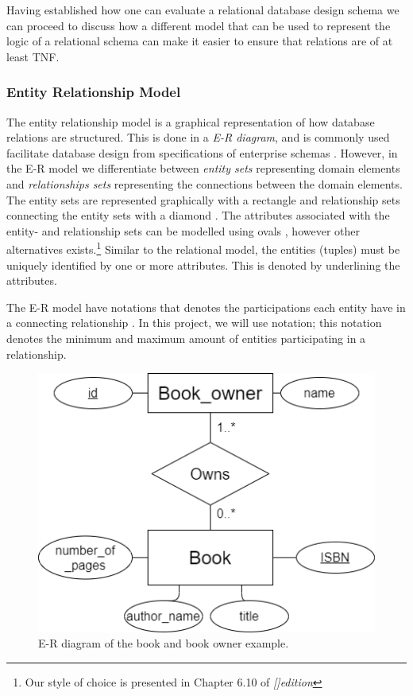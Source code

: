 Having established how one can evaluate a relational database design schema we can proceed to discuss how a different model that can be used to represent the logic of a relational schema can make it easier to ensure that relations are of at least TNF.

\subsubsection{Entity Relationship Model}\label{sec:EntityRelationModel}
The entity relationship model is a graphical representation of how database relations are structured.
This is done in a \textit{E-R diagram}, and is commonly used facilitate database design from specifications of enterprise schemas \cite{DBSBook}.
However, in the E-R model we differentiate between \textit{entity sets} representing domain elements and \textit{relationships sets} representing the connections between the domain elements. 
The entity sets are represented graphically with a rectangle and relationship sets connecting the entity sets with a diamond \cite{DBSBook}.
The attributes associated with the entity- and relationship sets can be modelled using ovals \cite{KatjaFirstPP}, however other alternatives exists.\footnote{Our style of choice is presented in Chapter 6.10 of  \textit{[]{edition}}}
Similar to the relational model, the entities (tuples) must be uniquely identified by one or more attributes. This is denoted by underlining the attributes. 

The E-R model have notations that denotes the participations each entity have in a connecting relationship \cite{DBSBook}.
In this project, we will use  notation; this notation denotes the minimum and maximum amount of entities participating in a relationship. 

\begin{figure}[htp]
    \centering
    \includegraphics[scale=0.5]{Images/book_example_w_cardinality.png}
    \caption{E-R diagram of the book and book owner example.}
    \label{fig:ER_Book_Example}
\end{figure}

